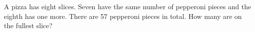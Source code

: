 A pizza has eight slices. Seven have the same number of pepperoni pieces and the eighth has one more. There are 57 pepperoni pieces in total. How many are on the fullest slice?
